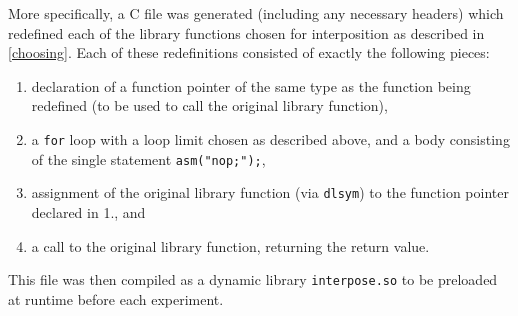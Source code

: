 More specifically, a C file was generated (including any necessary headers) which redefined each of the library functions chosen for interposition as described in \autoref{choosing}.
Each of these redefinitions consisted of exactly the following pieces:
\begin{enumerate}
	\item declaration of a function pointer of the same type as the function being redefined (to be used to call the original library function),
	\item a \texttt{for} loop with a loop limit chosen as described above, and a body consisting of the single statement \texttt{asm("nop;");},
	\item assignment of the original library function (via \texttt{dlsym}) to the function pointer declared in 1., and
	\item a call to the original library function, returning the return value.
\end{enumerate}
This file was then compiled as a dynamic library \texttt{interpose.so} to be preloaded at runtime before each experiment.